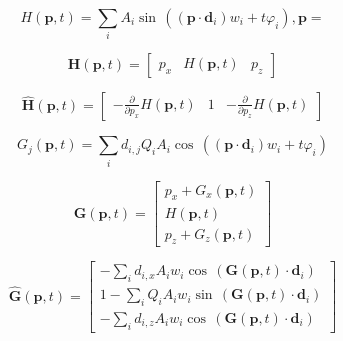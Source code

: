 \begin{equation} \label{eq:sum_of_sine_waves}
    H(\mathbf{p},t) = \sum_i{
        A_i \sin \, (
            (\mathbf{p} \cdot \mathbf{d}_i) w_i
            + t \varphi_i
        )
    } , \mathbf{p} = 
\end{equation}

\begin{equation} \label{eq:sum_of_sine_waves_position}
    \mathbf{H}(\mathbf{p},t) = \begin{bmatrix}
        p_x&
        H(\mathbf{p},t)&
        p_z
    \end{bmatrix}
\end{equation}

\begin{equation} \label{eq:sum_of_sine_waves_normal}
    \mathbf{\hat{H}}(\mathbf{p},t) = \begin{bmatrix}
        -\frac{\partial}{\partial p_x} H(\mathbf{p},t)&
        1&
        -\frac{\partial}{\partial p_z} H(\mathbf{p},t)
    \end{bmatrix}
\end{equation}

\begin{equation} \label{eq:gerstner_wave}
    G_j(\mathbf{p},t) = \sum_i{
        d_{i,j} Q_iA_i \cos \, (
            (\mathbf{p} \cdot \mathbf{d}_i) w_i
            + t \varphi_i
        )
    }
\end{equation}

\begin{equation} \label{eq:gerstner_wave_position}
    \mathbf{G}(\mathbf{p},t) = \begin{bmatrix}
        p_x + G_x(\mathbf{p},t)\\
        H(\mathbf{p},t)\\
        p_z + G_z(\mathbf{p},t)
    \end{bmatrix}
\end{equation}

\begin{equation} \label{eq:gerstner_wave_normal}
    \mathbf{\hat{G}}(\mathbf{p},t) = \begin{bmatrix}
        -\sum_i{d_{i,x} A_iw_i \cos \, (\mathbf{G}(\mathbf{p},t) \cdot \mathbf{d}_i)}\\
        1 - \sum_i{Q_iA_iw_i \sin \, (\mathbf{G}(\mathbf{p},t) \cdot \mathbf{d}_i)}\\
        -\sum_i{d_{i,z} A_iw_i \cos \, (\mathbf{G}(\mathbf{p},t) \cdot \mathbf{d}_i)}
    \end{bmatrix}
\end{equation}
